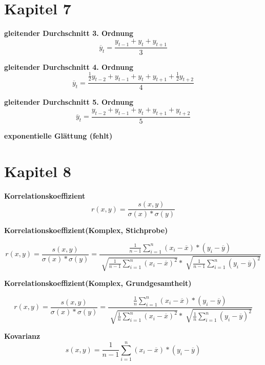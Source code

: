 \documentclass[11pt,twocolumn,fleqn]{article}
\begin{document}
\section{Kapitel 7}
\textbf{gleitender Durchschnitt 3. Ordnung}
\begin{equation*}
\overline{y}_t = \frac{y_{t-1} + y_t + y_{t+1}}{3}
\end{equation*}

\textbf{gleitender Durchschnitt 4. Ordnung}
\begin{equation*}
\overline{y}_t = \frac{ \frac{1}{2}y_{t-2} + y_{t-1} + y_t + y_{t+1} + \frac{1}{2}y_{t+2}}{4}
\end{equation*}

\textbf{gleitender Durchschnitt 5. Ordnung}
\begin{equation*}
\overline{y}_t = \frac{ y_{t-2} + y_{t-1} + y_t + y_{t+1} + y_{t+2}}{5}
\end{equation*}

\textbf{exponentielle Glättung (fehlt)}

\section{Kapitel 8}
\textbf{Korrelationskoeffizient}
\begin{equation*}
r(x,y)= \frac{s(x,y)}{\sigma(x)*\sigma(y)}
\end{equation*}

\textbf{Korrelationskoeffizient(Komplex, Stichprobe)}

  \begin{equation*}
  r(x,y)= \frac{s(x,y)}{\sigma(x)*\sigma(y)} = \frac{ \frac{1}{n-1}\sum^n_{i=1}(x_i-\overline{x})*(y_i-\overline{y}) }{ \sqrt[]{ \frac{1}{n-1}\sum^n_{i=1}(x_i - \overline{x})^2 } * \sqrt[]{ \frac{1}{n-1}\sum^n_{i=1}(y_i - \overline{y})^2 } }
  \end{equation*}
  
\textbf{Korrelationskoeffizient(Komplex, Grundgesamtheit)}

  \begin{equation*}
  r(x,y)= \frac{s(x,y)}{\sigma(x)*\sigma(y)} = \frac{ \frac{1}{n}\sum^n_{i=1}(x_i-\overline{x})*(y_i-\overline{y}) }{ \sqrt[]{ \frac{1}{n}\sum^n_{i=1}(x_i - \overline{x})^2 } * \sqrt[]{ \frac{1}{n}\sum^n_{i=1}(y_i - \overline{y})^2 } }
  \end{equation*}  


\textbf{Kovarianz}
\begin{equation*}
s(x,y)=\frac{1}{n-1}\sum^n_{i=1}(x_i-\overline{x})*(y_i-\overline{y}) 
\end{equation*}
\end{document}
